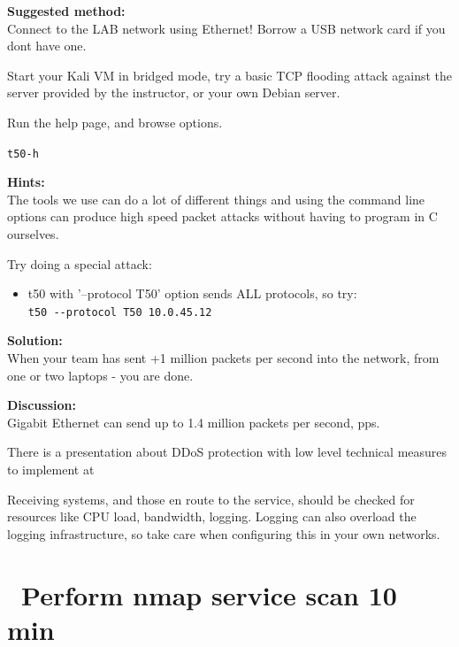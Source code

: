 \documentclass[a4paper,11pt,notitlepage]{report}
\begin{document}
{\bf Suggested method:}\\
Connect to the LAB network using Ethernet! Borrow a USB network card if you dont have one.

Start your Kali VM in bridged mode, try a basic TCP flooding attack against the server provided by the instructor, or your own Debian server.

Run the help page, and browse options.
\begin{alltt}\footnotesize
t50 -h
\end{alltt}





{\bf Hints:}\\
The tools we use can do a lot of different things and using the command line options can produce high speed packet attacks without having to program in C ourselves.

Try doing a special attack:
\begin{itemize}
\item t50 with '--protocol T50' option sends ALL protocols, so try:\\
\verb+t50 --protocol T50 10.0.45.12+
\end{itemize}


{\bf Solution:}\\
When your team has sent +1 million packets per second into the network, from one or two laptops - you are done.

{\bf Discussion:}\\
Gigabit Ethernet can send up to 1.4 million packets per second, pps.

There is a presentation about DDoS protection with low level technical measures to implement at\\
{\footnotesize {}}

Receiving systems, and those en route to the service, should be checked for resources like CPU load, bandwidth, logging. Logging can also overload the logging infrastructure, so take care when configuring this in your own networks.





\chapter{\faExclamationTriangle\ Perform nmap service scan 10 min}
\label{ex:nmap-service}
\end{document}

